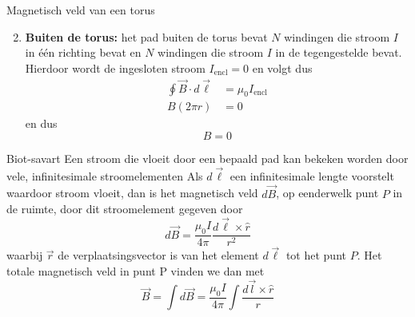 \begin{app}{Magnetisch veld van een torus}
\begin{minipage}{.23\textwidth}
    \end{minipage}
    \begin{enumerate}
        \setcounter{enumi}{1}
        \item \textbf{Buiten de torus:} het pad buiten de torus bevat $N$ windingen die stroom $I$ in één richting bevat en $N$ windingen
        die stroom $I$ in de tegengestelde bevat. Hierdoor wordt de ingesloten stroom $I_{\text{encl}} = 0$ en volgt dus
        \begin{align*}
            \oint \Vec{B} \cdot d\Vec{\ell} &= \mu_{0}I_{\text{encl}} \\
                    B(2 \pi r) &= 0
        \end{align*}
        en dus
        \begin{equation*}
            B = 0
        \end{equation*}
    \end{enumerate}
\end{app}

\begin{lem}{Biot-savart}
    Een stroom die vloeit door een bepaald pad kan bekeken worden door vele, infinitesimale
    stroomelementen
    Als $d\Vec{\ell}$ een infinitesimale lengte voorstelt waardoor stroom
    vloeit, dan is het magnetisch veld $d\Vec{B}$, op eenderwelk punt $P$ in de ruimte, door
    dit stroomelement gegeven door
    \begin{equation*}
        d\Vec{B} = \dfrac{\mu_{0}I}{4\pi}\dfrac{d\Vec{\ell} \times \hat{r}}{r^2}
    \end{equation*}
    waarbij $\Vec{r}$ de verplaatsingsvector is van het element $d\Vec{\ell}$ tot het punt $P$.
    Het totale magnetisch veld in punt P vinden we dan met
    \begin{equation*}
        \Vec{B} = \int d\Vec{B} = \dfrac{\mu_{0}I}{4\pi} \int \dfrac{d\Vec{l} \times \hat{r}}{r}
    \end{equation*}
\end{lem}

